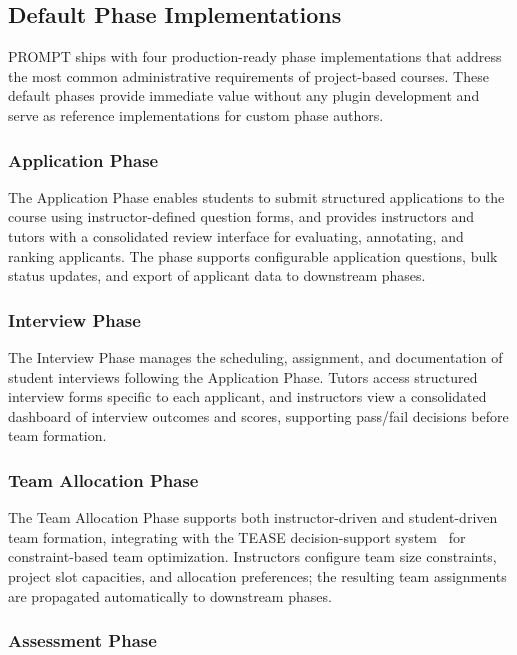 \subsection{Default Phase Implementations}

PROMPT ships with four production-ready phase implementations that address the most common administrative requirements of project-based courses.
These default phases provide immediate value without any plugin development and serve as reference implementations for custom phase authors.

\subsubsection{Application Phase}

The Application Phase enables students to submit structured applications to the course using instructor-defined question forms, and provides instructors and tutors with a consolidated review interface for evaluating, annotating, and ranking applicants.
The phase supports configurable application questions, bulk status updates, and export of applicant data to downstream phases.

\subsubsection{Interview Phase}

The Interview Phase manages the scheduling, assignment, and documentation of student interviews following the Application Phase.
Tutors access structured interview forms specific to each applicant, and instructors view a consolidated dashboard of interview outcomes and scores, supporting pass/fail decisions before team formation.

\subsubsection{Team Allocation Phase}

The Team Allocation Phase supports both instructor-driven and student-driven team formation, integrating with the TEASE decision-support system~\cite{tease} for constraint-based team optimization.
Instructors configure team size constraints, project slot capacities, and allocation preferences;
the resulting team assignments are propagated automatically to downstream phases.

\subsubsection{Assessment Phase}

